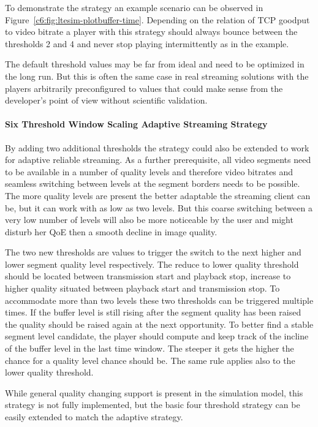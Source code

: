 To demonstrate the strategy an example scenario can be observed in Figure~\ref{c6:fig:ltesim-plotbuffer-time}. Depending on the relation of \gls{TCP} goodput to video bitrate a player with this strategy should always bounce between the thresholds 2 and 4 and never stop playing intermittently as in the example.

The default threshold values may be far from ideal and need to be optimized in the long run. But this is often the same case in real streaming solutions with the players arbitrarily preconfigured to values that could make sense from the developer's point of view without scientific validation.


\paragraph{Six Threshold Window Scaling Adaptive Streaming Strategy}

By adding two additional thresholds the strategy could also be extended to work for adaptive reliable streaming. As a further prerequisite, all video segments need to be available in a number of quality levels and therefore video bitrates and seamless switching between levels at the segment borders needs to be possible. The more quality levels are present the better adaptable the streaming client can be, but it can work with as low as two levels. But this coarse switching between a very low number of levels will also be more noticeable by the user and might disturb her \gls{QoE} then a smooth decline in image quality.

The two new thresholds are values to trigger the switch to the next higher and lower segment quality level respectively. The reduce to lower quality threshold should be located between transmission start and playback stop, increase to higher quality situated between playback start and transmission stop. To accommodate more than two levels these two thresholds can be triggered multiple times. If the buffer level is still rising after the segment quality has been raised the quality should be raised again at the next opportunity. To better find a stable segment level candidate, the player should compute and keep track of the incline of the buffer level in the last time window. The steeper it gets the higher the chance for a quality level chance should be. The same rule applies also to the lower quality threshold.

While general quality changing support is present in the simulation model, this strategy is not fully implemented, but the basic four threshold strategy can be easily extended to match the adaptive strategy.


